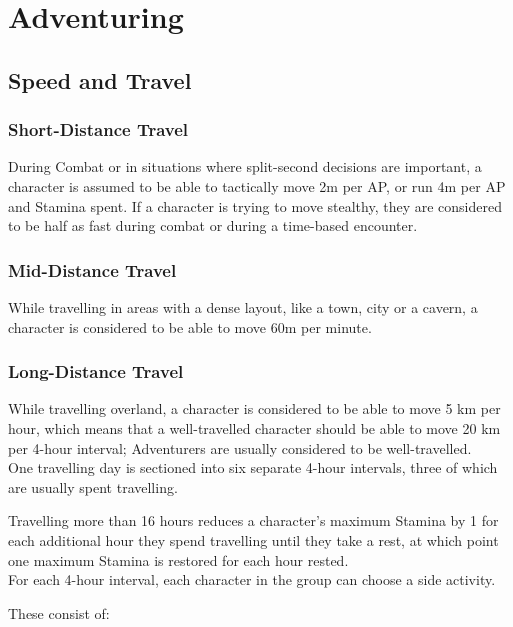\chapter{Adventuring}\label{ch:adventuring}
\section{Speed and Travel}\label{sec:timeSpeedTravel}
\subsection{Short-Distance Travel}\label{subsec:shortDistanceTravel}
During Combat or in situations where split-second decisions are important, a character is assumed to be able to tactically move 2m per AP, or run 4m per AP and Stamina spent.
If a character is trying to move stealthy, they are considered to be half as fast during combat or during a time-based encounter.\\

\subsection{Mid-Distance Travel}\label{subsec:midDistanceTravel}
While travelling in areas with a dense layout, like a town, city or a cavern, a character is considered to be able to move 60m per minute.

\subsection{Long-Distance Travel}\label{subsec:longDistanceTravel}
While travelling overland, a character is considered to be able to move 5 km per hour, which means that a well-travelled character should be able to move 20 km per 4-hour interval;
Adventurers are usually considered to be well-travelled.\\

One travelling day is sectioned into six separate 4-hour intervals, three of which are usually spent travelling.

Travelling more than 16 hours reduces a character's maximum Stamina by 1 for each additional hour they spend travelling until they take a rest, at which point one maximum Stamina is restored for each hour rested.\\

For each 4-hour interval, each character in the group can choose a side activity.

These consist of:


